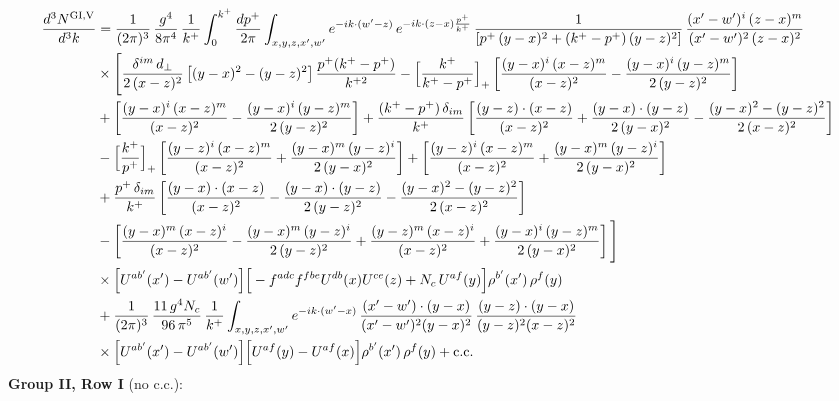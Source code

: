 \documentclass[9pt]{article}
\numberwithin{equation}{section}
\begin{document}
\begin{align}
\frac{d^{3}N^{\rm GI,V}}{d^{3}k}&=\frac{1}{(2\pi)^{3}}\,\frac{g^{4}}{8\pi^{4}}\,\frac{1}{k^{+}}\int_{0}^{k^{+}}\frac{dp^{+}}{2\pi}\int_{x,y,z,x',w'}e^{-ik\cdot(w'-z)}\,e^{-ik\cdot(z-x)\frac{p^{+}}{k^{+}}}\,\frac{1}{\left[p^{+}\,(y-x)^{2}+(k^{+}-p^{+})\,(y-z)^{2}\right]}\,\frac{(x'-w')^{i}\,(z-x)^{m}}{(x'-w')^{2}\,(z-x)^{2}}\notag\\
&\times\Bigg[\frac{\delta^{im}\,d_{\perp}}{2\,(x-z)^{2}}\left[(y-x)^{2}-(y-z)^{2}\right]\frac{p^{+}(k^{+}-p^{+})}{k^{+2}}
-\Big[\frac{k^{+}}{k^{+}-p^{+}}\Big]_{+}\left[\frac{(y-x)^{i}\,(x-z)^{m}}{(x-z)^{2}}-\frac{(y-x)^{i}\,(y-z)^{m}}{2\,(y-z)^{2}}\right]\notag\\
&+\left[\frac{(y-x)^{i}\,(x-z)^{m}}{(x-z)^{2}}-\frac{(y-x)^{i}\,(y-z)^{m}}{2\,(y-z)^{2}}\right]
+\frac{(k^{+}-p^{+})\,\delta_{im}}{k^{+}}\left[\frac{(y-z)\cdot(x-z)}{(x-z)^{2}}+\frac{(y-x)\cdot(y-z)}{2\,(y-x)^{2}}-\frac{(y-x)^{2}-(y-z)^{2}}{2\,(x-z)^{2}}\right]\notag\\
&-\Big[\frac{k^{+}}{p^{+}}\Big]_{+}\left[\frac{(y-z)^{i}\,(x-z)^{m}}{(x-z)^{2}}+\frac{(y-x)^{m}\,(y-z)^{i}}{2\,(y-x)^{2}}\right]+\left[\frac{(y-z)^{i}\,(x-z)^{m}}{(x-z)^{2}}+\frac{(y-x)^{m}\,(y-z)^{i}}{2\,(y-x)^{2}}\right]\notag\\
&+\frac{p^{+}\,\delta_{im}}{k^{+}}\left[\frac{(y-x)\cdot(x-z)}{(x-z)^{2}}-\frac{(y-x)\cdot(y-z)}{2\,(y-z)^{2}}-\frac{(y-x)^{2}-(y-z)^{2}}{2\,(x-z)^{2}}\right]\notag\\
&-\left[\frac{(y-x)^{m}\,(x-z)^{i}}{(x-z)^{2}}-\frac{(y-x)^{m}\,(y-z)^{i}}{2\,(y-z)^{2}}+\frac{(y-z)^{m}\,(x-z)^{i}}{(x-z)^{2}}+\frac{(y-x)^{i}\,(y-z)^{m}}{2\,(y-x)^{2}}\right]\Bigg]\notag\\
&\times\Big[U^{ab'}(x')-U^{ab'}(w')\Big]\Big[-f^{adc}f^{fbe}U^{db}(x)U^{ce}(z)+N_{c}\,U^{af}(y)\Big]\rho^{b'}(x')\,\rho^{f}(y)\notag\\
&+\frac{1}{(2\pi)^{3}}\,\frac{11\,g^{4}N_{c}}{96\,\pi^{5}}\,\frac{1}{k^{+}}\int_{x,y,z,x',w'}e^{-ik\cdot(w'-x)}\,\frac{(x'-w')\cdot(y-x)}{(x'-w')^{2}(y-x)^{2}}\,\frac{(y-z)\cdot(y-x)}{(y-z)^{2}(x-z)^{2}}\notag\\
&\times\Big[U^{ab'}(x')-U^{ab'}(w')\Big]\Big[U^{af}(y)-U^{af}(x)\Big]\rho^{b'}(x')\,\rho^{f}(y)+{\rm c.c.}
\end{align}
\textbf{Group II, Row I} (no c.c.):
\end{document}
